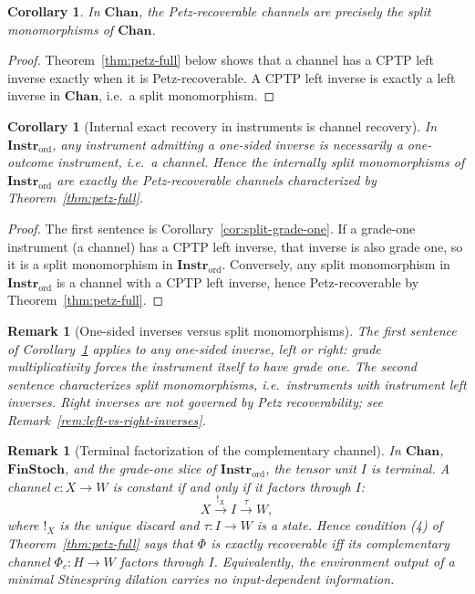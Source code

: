 \documentclass[11pt]{article}
\newtheorem{corollary}[theorem]{Corollary}
\newtheorem{remark}[theorem]{Remark}
\begin{document}
\begin{corollary}
In $\mathbf{Chan}$, the Petz-recoverable channels are precisely the split
monomorphisms of $\mathbf{Chan}$.
\end{corollary}

\begin{proof}
Theorem~\ref{thm:petz-full} below shows that a channel has a CPTP left
inverse exactly when it is Petz-recoverable. A CPTP left inverse is exactly
a left inverse in $\mathbf{Chan}$, i.e.\ a split monomorphism.
\end{proof}

\begin{corollary}[Internal exact recovery in instruments is channel
recovery]
\label{cor:instr-split-channels}
In $\mathbf{Instr}_{\mathrm{ord}}$, any instrument admitting a one-sided
inverse is necessarily a one-outcome instrument, i.e.\ a channel. Hence the
internally split monomorphisms of $\mathbf{Instr}_{\mathrm{ord}}$ are
exactly the Petz-recoverable channels characterized by
Theorem~\ref{thm:petz-full}.
\end{corollary}

\begin{proof}
The first sentence is Corollary~\ref{cor:split-grade-one}. If a grade-one
instrument (a channel) has a CPTP left inverse, that inverse is also grade
one, so it is a split monomorphism in $\mathbf{Instr}_{\mathrm{ord}}$.
Conversely, any split monomorphism in $\mathbf{Instr}_{\mathrm{ord}}$ is a
channel with a CPTP left inverse, hence Petz-recoverable by
Theorem~\ref{thm:petz-full}.
\end{proof}

\begin{remark}[One-sided inverses versus split monomorphisms]
\label{rem:one-sided-vs-split}
The first sentence of Corollary~\ref{cor:instr-split-channels} applies to
any one-sided inverse, left or right: grade multiplicativity forces the
instrument itself to have grade one. The second sentence characterizes split
monomorphisms, i.e.\ instruments with instrument left inverses. Right
inverses are not governed by Petz recoverability; see
Remark~\ref{rem:left-vs-right-inverses}.
\end{remark}

\begin{remark}[Terminal factorization of the complementary channel]
\label{rem:petz-terminal-factorization}
In $\mathbf{Chan}$, $\mathbf{FinStoch}$, and the grade-one slice of
$\mathbf{Instr}_{\mathrm{ord}}$, the tensor unit $I$ is terminal. A channel
$c:X\to W$ is constant if and only if it factors through $I$:
\[
X\xrightarrow{!_X}I\xrightarrow{\tau}W,
\]
where $!_X$ is the unique discard and $\tau:I\to W$ is a state. Hence
condition (4) of Theorem~\ref{thm:petz-full} says that $\Phi$ is exactly
recoverable iff its complementary channel $\Phi_c:H\to W$ factors through
$I$. Equivalently, the environment output of a minimal Stinespring dilation
carries no input-dependent information.
\end{remark}
\end{document}
